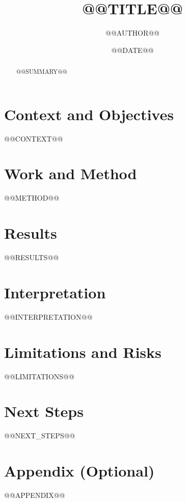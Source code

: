 \documentclass[lang=en,a4paper,11pt]{elegantpaper}
\title{@@TITLE@@}
\author{@@AUTHOR@@}
\institute{}
\date{@@DATE@@}
\begin{document}
\maketitle

\begin{abstract}
@@SUMMARY@@
\end{abstract}

\section{Context and Objectives}
@@CONTEXT@@

\section{Work and Method}
@@METHOD@@

\section{Results}
@@RESULTS@@

\section{Interpretation}
@@INTERPRETATION@@

\section{Limitations and Risks}
@@LIMITATIONS@@

\section{Next Steps}
@@NEXT_STEPS@@

\appendix
\section{Appendix (Optional)}
@@APPENDIX@@

\end{document}
